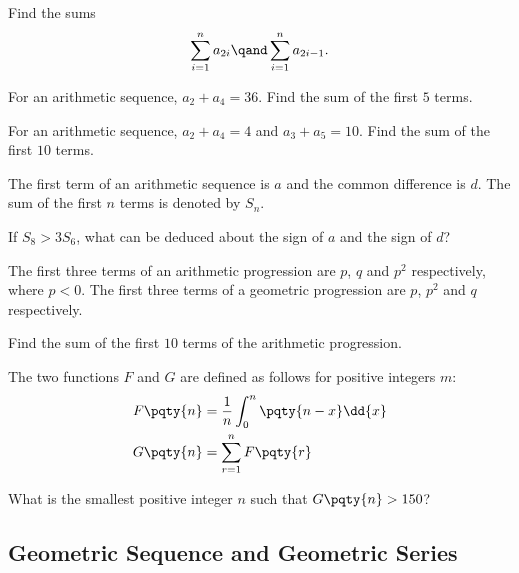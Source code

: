 \documentclass{article}
\begin{document}
\begin{example}
    Find the sums
    \[
        \sum_{i = 1}^{n} a_{2i} \qand \sum_{i = 1}^{n} a_{2i - 1}.
    \]
\end{example}

\begin{example}
    For an arithmetic sequence, \(a_2 + a_4 = 36\). Find the sum of the first \(5\) terms.
\end{example}

\begin{example}
    For an arithmetic sequence, \(a_2 + a_4 = 4\) and \(a_3 + a_5 = 10\). Find the sum of the first \(10\) terms.
\end{example}

\begin{example}[TMUA 2016 P2 Q12]
    The first term of an arithmetic sequence is \(a\) and the common difference is \(d\). The sum of the first \(n\) terms is denoted by \(S_n\).

    If \(S_8 > 3 S_6\), what can be deduced about the sign of \(a\) and the sign of \(d\)?
\end{example}

\begin{example}[TMUA 2017 P1 Q7]
    The first three terms of an arithmetic progression are \(p\), \(q\) and \(p^2\) respectively, where \(p < 0\). The first three terms of a geometric progression are \(p\), \(p^2\) and \(q\) respectively.

    Find the sum of the first \(10\) terms of the arithmetic progression.
\end{example}

\begin{example}[TMUA 2017 P1 Q17]
    The two functions \(F\) and \(G\) are defined as follows for positive integers \(m\):
    \begin{align*}
        F\pqty{n} &= \frac{1}{n} \int_{0}^{n} \pqty{n - x} \dd{x} \\
        G\pqty{n} &= \sum_{r = 1}^{n} F\pqty{r}
    \end{align*}

    What is the smallest positive integer \(n\) such that \(G\pqty{n} > 150\)?
\end{example}

\subsection{Geometric Sequence and Geometric Series}
\end{document}
